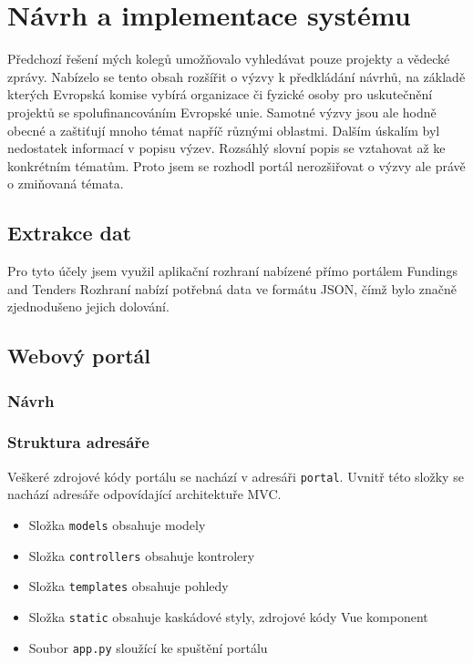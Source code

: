 \chapter{Návrh a implementace systému}
Předchozí řešení mých kolegů umožňovalo vyhledávat pouze projekty a vědecké zprávy. Nabízelo se tento obsah rozšířit o výzvy k předkládání návrhů, na základě kterých Evropská komise vybírá organizace či fyzické osoby pro uskutečnění projektů se spolufinancováním Evropské unie.
Samotné výzvy jsou ale hodně obecné a zaštiťují mnoho témat napříč různými oblastmi. Dalším úskalím byl nedostatek informací v popisu výzev. Rozsáhlý slovní popis se vztahovat až ke konkrétním tématům. Proto jsem se rozhodl portál nerozšiřovat o výzvy ale právě o zmiňovaná témata.

\section{Extrakce dat}
\blindtext

Pro tyto účely jsem využil aplikační rozhraní nabízené přímo portálem Fundings and Tenders %
Rozhraní nabízí potřebná data ve formátu JSON, čímž bylo značně zjednodušeno jejich dolování.

\section{Webový portál}
\blindtext

\subsection{Návrh}
\blindtext

\subsection{Struktura adresáře}
Veškeré zdrojové kódy portálu se nachází v adresáři \texttt{portal}. Uvnitř této složky se nachází adresáře odpovídající architektuře MVC.
\begin{itemize}
  \item Složka \texttt{models} obsahuje modely
  \item Složka \texttt{controllers} obsahuje kontrolery
  \item Složka \texttt{templates} obsahuje pohledy
  \item Složka \texttt{static} obsahuje kaskádové styly, zdrojové kódy Vue komponent
  \item Soubor \texttt{app.py} sloužící ke spuštění portálu
\end{itemize}

